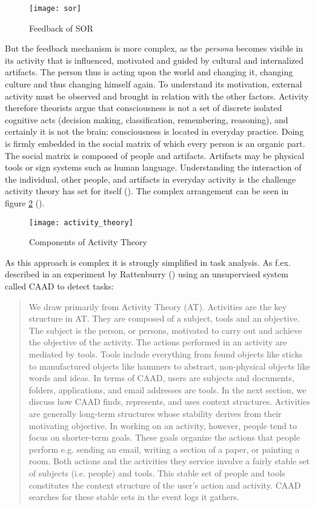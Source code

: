 \begin{figure}[ht]
	\centering
  \texttt{[image: sor]}
	\caption{Feedback of SOR}
	\label{fig2}
\end{figure}

But the feedback mechanism is more complex, as the \textit{persona} becomes visible in its activity that is influenced, motivated and guided by cultural and internalized artifacts. The person thus is acting upon the world and changing it, changing culture and thus changing himself again. To understand its motivation, external activity must be observed and brought in relation with the other factors. Activity therefore theorists argue that consciousness is not a set of discrete isolated cognitive acts (decision making, classification, remembering, reasoning), and certainly it is not the brain: consciousness is located in everyday practice. Doing is firmly embedded in the social matrix of which every person is an organic part. The social matrix is composed of people and artifacts. Artifacts may be physical tools or sign systems such as human language. Understanding the interaction of the individual, other people, and artifacts in everyday activity is the challenge activity theory has set for itself (\cite{nardi1996activity}). The complex arrangement can be seen in figure \ref{fig3} (\cite{bryant2005becoming}).

\begin{figure}[ht]
	\centering
  \texttt{[image: activity\_theory]}
	\caption{Components of Activity Theory}
	\label{fig3}
\end{figure}


As this approach is complex it is strongly simplified in task analysis. As f.ex. described in an experiment by Rattenburry (\cite{rattenbury2007caad}) using an unsupervised system called CAAD to detect tasks:
\begin{quotation}
We draw primarily from Activity Theory (AT). Activities are the key structure in AT. They are composed of a subject, tools and an objective. The subject is the person, or persons, motivated to carry out and achieve the objective of the activity. The actions performed in an activity are mediated by tools. Tools include everything from found objects like sticks to manufactured objects like hammers to abstract, non-physical objects like words and ideas. In terms of CAAD, users are subjects and documents, folders, applications, and email addresses are tools. In the next section, we discuss how CAAD finds, represents, and uses context structures. Activities are generally long-term structures whose stability derives from their motivating objective. In working on an activity, however, people tend to focus on shorter-term goals. These goals organize the actions that people perform e.g. sending an email, writing a section of a paper, or painting a room. Both actions and the activities they service involve a fairly stable set of subjects (i.e. people) and tools. This stable set of people and tools constitutes the context structure of the user’s action and activity. CAAD searches for these stable sets in the event logs it gathers.
\end{quotation}

